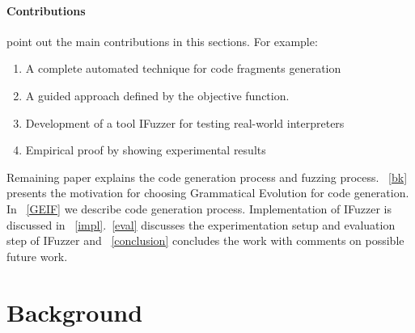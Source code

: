 \documentclass{acm_proc_article-sp}
\begin{document}
\paragraph{Contributions} point out the main contributions in this sections. For example:
\begin{enumerate}
\item A complete automated technique for code fragments generation
\item A guided approach defined by the objective function.
\item Development of a tool IFuzzer for testing real-world interpreters
\item Empirical proof by showing experimental results
\end{enumerate}

\indent Remaining paper explains the code generation process and fuzzing process. ~\autoref{bk} presents the motivation for choosing Grammatical Evolution for code generation. In ~\autoref{GEIF} we describe code generation process. Implementation of IFuzzer is discussed in ~\autoref{impl}.~\autoref{eval} discusses the experimentation setup and evaluation step of IFuzzer and ~\autoref{conclusion} concludes the work with comments on possible future work.

\section{Background} \label{bk}
\end{document}
